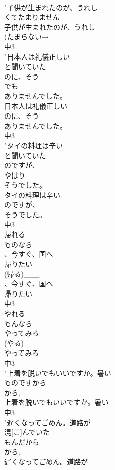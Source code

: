 \documentclass[8pt]{extreport}
\begin{document}
\begin{CJK}{UTF8}{min}
\\	"子供が生まれたのが、うれし
\\	くてたまりません
\\	子供が生まれたのが、うれし
\\	(たまらない→ 
\\	中3
\\	"日本人は礼儀正しい
\\	と聞いていた
\\	のに、そう
\\	でも
\\	ありませんでした。
\\	日本人は礼儀正しい
\\	のに、そう
\\	ありませんでした。
\\	中3
\\	"タイの料理は辛い
\\	と聞いていた
\\	のですが、
\\	やはり
\\	そうでした。
\\	タイの料理は辛い
\\	のですが、
\\	そうでした。
\\	中3
\\	帰れる
\\	ものなら
\\	、今すぐ、国へ
\\	帰りたい
\\	(帰る)___
\\	、今すぐ、国へ
\\	帰りたい
\\	中3
\\	やれる
\\	もんなら
\\	やってみろ
\\	(やる)
\\	やってみろ
\\	中3
\\	"上着を脱いでもいいですか。暑い
\\	ものですから
\\	から, 
\\	上着を脱いでもいいですか。暑い
\\	中3
\\	"遅くなってごめん。道路が
\\	混[こ]んでいた
\\	もんだから
\\	から, 
\\	遅くなってごめん。道路が

\end{CJK}
\end{document}
